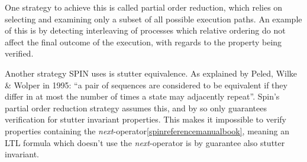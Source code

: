 One strategy to achieve this is called partial order reduction, which relies on selecting and examining only a subset of all possible execution paths. An example of this is by detecting interleaving of processes which relative ordering do not affect the final outcome of the execution, with regards to the property being verified. 


Another strategy SPIN uses is stutter equivalence. As explained by Peled, Wilke \& Wolper in 1995\cite{peled1996algorithmic}: “a pair of sequences are considered to be equivalent if they differ in at most the number of times a state may adjacently repeat”. Spin's partial order reduction strategy assumes this, and by so only guarantees verification for stutter invariant properties. This makes it impossible to verify properties containing the \textit{next}-operator\ref{spinreferencemanualbook}, meaning an LTL formula which doesn't use the \textit{next}-operator is by guarantee also stutter invariant.











